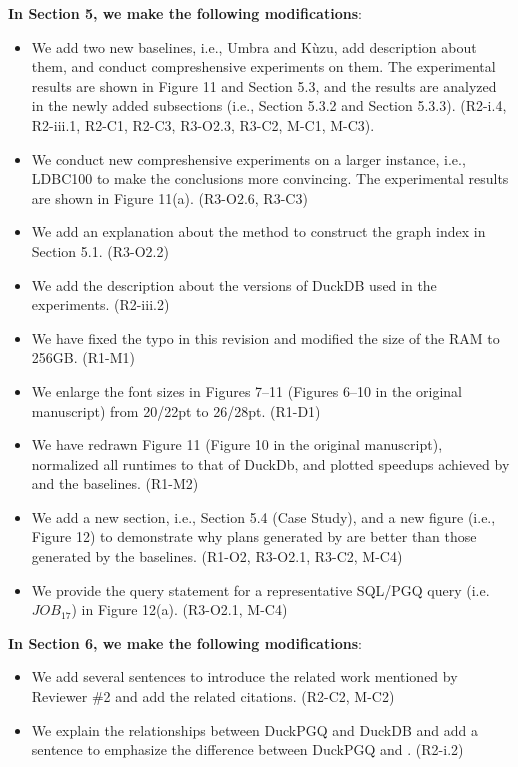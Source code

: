 \textbf{In Section 5, we make the following modifications}:
\begin{itemize}
	\item We add two new baselines, i.e., Umbra and K\`uzu, add description about them, and conduct compreshensive experiments on them. The experimental results are shown in Figure 11 and Section 5.3, and the results are analyzed in the newly added subsections (i.e., Section 5.3.2 and Section 5.3.3). (R2-i.4, R2-iii.1, R2-C1, R2-C3, R3-O2.3, R3-C2, M-C1, M-C3). 
	\item We conduct new compreshensive experiments on a larger instance, i.e., LDBC100 to make the conclusions more convincing. The experimental results are shown in Figure 11(a). (R3-O2.6, R3-C3)
	\item We add an explanation about the method to construct the graph index in Section 5.1. (R3-O2.2)
	\item We add the description about the versions of DuckDB used in the experiments. (R2-iii.2)
	\item We have fixed the typo in this revision and modified the size of the RAM to 256GB. (R1-M1)
	\item We enlarge the font sizes in Figures 7--11 (Figures 6--10 in the original manuscript) from 20/22pt to 26/28pt. (R1-D1)
	\item We have redrawn Figure 11 (Figure 10 in the original manuscript), normalized all runtimes to that of DuckDb, and plotted speedups achieved by \name and the baselines. (R1-M2)
	\item We add a new section, i.e., Section 5.4 (Case Study), and a new figure (i.e., Figure 12) to demonstrate why plans generated by \name are better than those generated by the baselines. (R1-O2, R3-O2.1, R3-C2, M-C4)
	\item We provide the query statement for a representative SQL/PGQ query (i.e. $JOB_{17}$) in Figure 12(a). (R3-O2.1, M-C4)
\end{itemize}

\textbf{In Section 6, we make the following modifications}:
\begin{itemize}
	\item We add several sentences to introduce the related work mentioned by Reviewer \#2 and add the related citations. (R2-C2, M-C2)
	\item We explain the relationships between DuckPGQ and DuckDB and add a sentence to emphasize the difference between DuckPGQ and \name. (R2-i.2)
\end{itemize}

